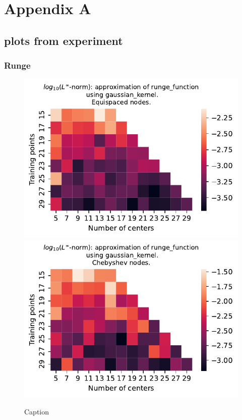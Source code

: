 \documentclass[12pt]{report} %
\begin{document}



\clearpage


\printbibliography




\chapter*{Appendix A}\label{appendix-1d}

\section*{plots from experiment}

\subsection*{Runge}

\begin{figure}[ht]
    \centering
    
    \includegraphics[width=.49\textwidth]{imagenes/experiments/1d/variational/runge_function-Kgaussian_kernel-Equi.pdf}
    \includegraphics[width=.49\textwidth]{imagenes/experiments/1d/variational/runge_function-Kgaussian_kernel-Cheb.pdf}
    \caption{Caption}
    \label{fig:runge-gaussian}
\end{figure}
\end{document}
